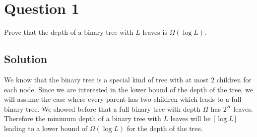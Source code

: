 
\section*{Question 1}

Prove that the depth of a binary tree with $L$ leaves is $\Omega(\log L)$.

\subsection*{Solution}

We know that the binary tree is a special kind of tree with at most 2 children for each node.
Since we are interested in the lower bound of the depth of the tree, we will assume the case where every parent has two children which leads to a full binary tree.
We showed before that a full binary tree with depth $H$ has $2^H$ leaves.
Therefore the minimum depth of a binary tree with $L$ leaves will be $\lceil \log L \rceil$ leading to a lower bound of $\Omega (\log L)$ for the depth of the tree.
